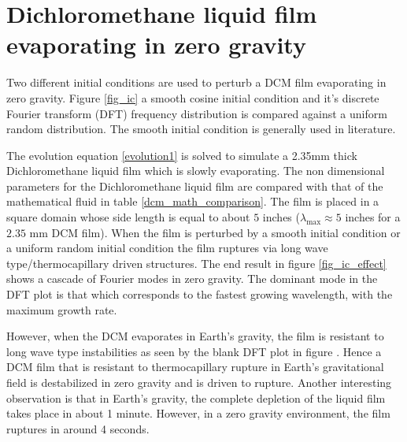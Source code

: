 \documentclass[a4paper,12pt]{article}
\begin{document}
\section{Dichloromethane liquid film evaporating in zero gravity}

Two different initial conditions are used to perturb a DCM film evaporating in zero gravity. Figure \ref{fig_ic} a smooth cosine initial condition and it's discrete Fourier transform (DFT) frequency distribution is compared against a uniform random distribution. The smooth initial condition is generally used in literature.

 The evolution equation \ref{evolution1} is solved to simulate a 2.35mm thick Dichloromethane liquid film which is slowly evaporating. The non dimensional parameters for the Dichloromethane liquid film are compared with that of the mathematical fluid in table \ref{dcm_math_comparison}. The film is placed in a square domain whose side length is equal to about $5$ inches ($\lambda_\text{max} \approx 5$ inches for a $2.35$ mm DCM film). When the film is perturbed by a smooth initial condition or a uniform random initial condition the film ruptures via long wave type/thermocapillary driven structures. The end result in figure \ref{fig_ic_effect} shows a cascade of Fourier modes in zero gravity. The dominant mode in the DFT plot is that which corresponds to the fastest growing wavelength, with the maximum growth rate.

However, when the DCM evaporates in Earth's gravity, the film is resistant to long wave type instabilities as seen by the blank DFT plot in figure . Hence a DCM film that is resistant to thermocapillary rupture in Earth's gravitational field is destabilized in zero gravity and is driven to rupture. Another interesting observation is that in Earth's gravity, the complete depletion of the liquid film takes place in about 1 minute. However, in a zero gravity environment, the film ruptures in around 4 seconds.


\end{document}
